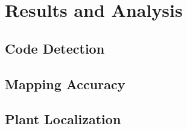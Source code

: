 
\cleardoublepage

\chapter{Results and Analysis}
\label{processing}

\section{Code Detection}


\section{Mapping Accuracy}


\section{Plant Localization}

